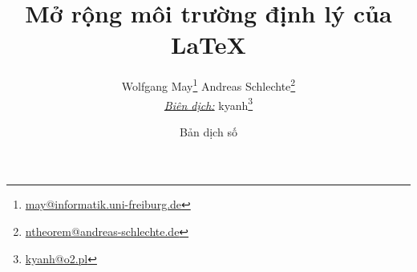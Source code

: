 \documentclass[11pt,oneside]{ltxdoc}
\theoremstyle{marginbreak}
\theoremstyle{changebreak}
\theoremstyle{change}
\theoremstyle{plain}
\theoremstyle{nonumberplain}
\begin{document}

\title{%
	Mở rộng môi trường định lý của \LaTeX{}
}
\author{%
	Wolfgang May\thanks{\url{may@informatik.uni-freiburg.de}}
	\qquad 
	Andreas Schlechte\thanks{\url{ntheorem@andreas-schlechte.de}}\\[2mm]
	\emph{\underline{Biên dịch:}} kyanh\thanks{\url{kyanh@o2.pl}}%
}
\date{%
	Bản dịch số \textbf{\the\buildnum}\\[2mm]
	}

\maketitle          

\end{document}
